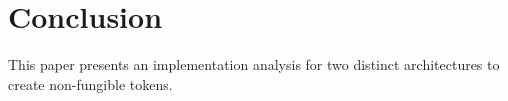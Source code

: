\documentclass[../NFTComp_IEEE.tex]{subfiles}
\begin{document}
\section{Conclusion}
\label{sec:conclusion}
This paper presents an implementation analysis for two distinct architectures to create non-fungible tokens.
\end{document}
